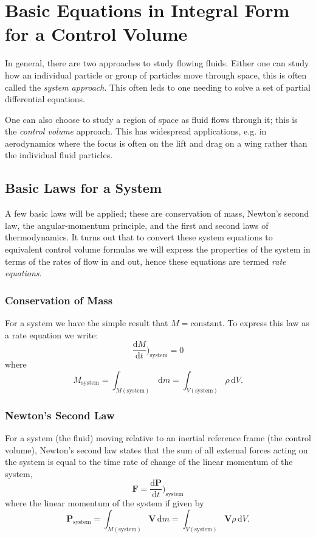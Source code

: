 
\section{Basic Equations in Integral Form for a Control Volume}
In general, there are two approaches to study flowing fluids. Either one can study how an individual particle or group of particles move through space, this is often called the \textit{system approach}. This often leds to one needing to solve a set of partial differential equations.

One can also choose to study a region of space as fluid flows through it; this is the \textit{control volume} approach. This has widespread applications, e.g. in aerodynamics where the focus is often on the lift and drag on a wing rather than the individual fluid particles.

\subsection{Basic Laws for a System}
A few basic laws will be applied; these are conservation of mass, Newton's second law, the angular-momentum principle, and the first and second laws of thermodynamics. It turns out that to convert these system equations to equivalent control volume formulas we will express the properties of the system in terms of the rates of flow in and out, hence these equations are termed \textit{rate equations}.

\subsubsection{Conservation of Mass} \label{afs:consmass}
For a system we have the simple result that $M = \mathrm{constant}$. To express this law as a rate equation we write:
\[ 
\frac{\mathrm{d}M}{\mathrm{d}t} \bigg)_{\mathrm{system}} = 0
\]
where
\[ 
M_{\mathrm{system}} = \int_{M (\mathrm{system})} \, \mathrm{d}m = \int_{V \left( \mathrm{system} \right)} \rho \, \mathrm{d}V
.\]

\subsubsection{Newton's Second Law} \label{afs:N2}
For a system (the fluid) moving relative to an inertial reference frame (the control volume), Newton's second law states that the sum of all external forces acting on the system is equal to the time rate of change of the linear momentum of the system,
\[ 
\textbf{F} = \frac{\mathrm{d}\textbf{P}}{\mathrm{d}t} \bigg)_{\mathrm{system}}
\]
where the linear momentum of the system if given by
\[ 
\textbf{P}_{\mathrm{system}} = \int_{M (\mathrm{system})} \textbf{V} \, \mathrm{d}m = \int_{V (\mathrm{system})} \textbf{V} \rho \, \mathrm{d}V
.\]

